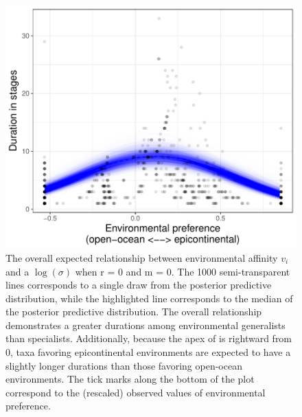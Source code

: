 \documentclass[11pt]{article}
\begin{document}
  \begin{figure}[ht]
  \centering
  \includegraphics[height = 0.5\textheight,width=\textwidth,keepaspectratio=true]{figure/env_effect_med_cweib_cens}
  \caption{The overall expected relationship between environmental affinity \(v_{i}\) and a \(\log(\sigma)\) when r = 0 and m = 0. The 1000 semi-transparent lines corresponds to a single draw from the posterior predictive distribution, while the highlighted line corresponds to the median of the posterior predictive distribution. The overall relationship demonstrates a greater durations among environmental generalists than specialists. Additionally, because the apex of is rightward from 0, taxa favoring epicontinental environments are expected to have a slightly longer durations than those favoring open-ocean environments. The tick marks along the bottom of the plot correspond to the (rescaled) observed values of environmental preference.}
  \label{fig:env_mean}
\end{figure}

\end{document}
